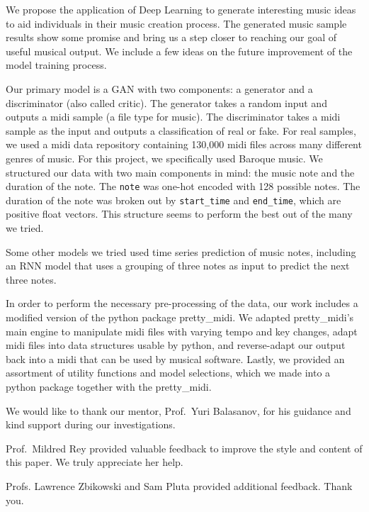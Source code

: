 \documentclass[12pt,oneside]{chicagocapstone}
\begin{document}
  \begin{executive}
    We propose the application of Deep Learning to generate interesting music ideas to aid individuals in their music creation process. The generated music sample results show some promise and bring us a step closer to reaching our goal of useful musical output. We include a few ideas on the future improvement of the model training process.
    
    Our primary model is a GAN with two components: a generator and a discriminator (also called critic). The generator takes a random input and outputs a midi sample (a file type for music). The discriminator takes a midi sample as the input and outputs a classification of real or fake. For real samples, we used a midi data repository containing 130,000 midi files across many different genres of music. For this project, we specifically used Baroque music. We structured our data with two main components in mind: the music note and the duration of the note. The \texttt{note} was one-hot encoded with 128 possible notes. The duration of the note was broken out by \texttt{start\_time} and \texttt{end\_time}, which are positive float vectors. This structure seems to perform the best out of the many we tried.
    
    Some other models we tried used time series prediction of music notes, including an RNN model that uses a grouping of three notes as input to predict the next three notes.
    
    In order to perform the necessary pre-processing of the data, our work includes a modified version of the python package pretty\_midi. We adapted pretty\_midi's main engine to manipulate midi files with varying tempo and key changes, adapt midi files into data structures usable by python, and reverse-adapt our output back into a midi that can be used by musical software. Lastly, we provided an assortment of utility functions and model selections, which we made into a python package together with the pretty\_midi.
    
    \bigskip
    \bigskip
    \bigskip
  \end{executive}

  \begin{acknowledgements}
    We would like to thank our mentor, Prof.~Yuri Balasanov, for his guidance and kind support during our investigations.
    
    Prof.~Mildred Rey provided valuable feedback to improve the style and content of this paper. We truly appreciate her help.
    
    Profs. Lawrence Zbikowski and Sam Pluta provided additional feedback. Thank you.
  \end{acknowledgements}
\end{document}
